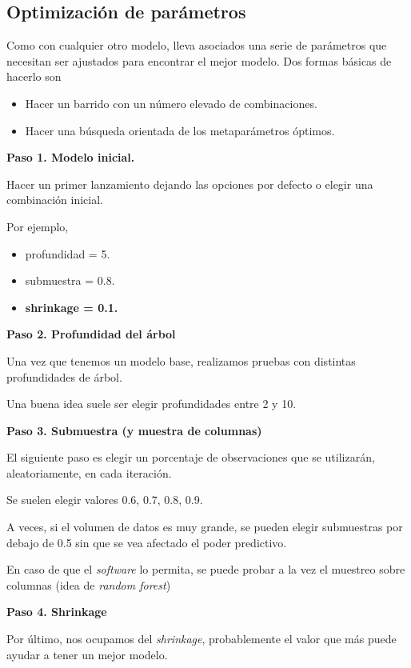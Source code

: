\documentclass[]{book}
\providecommand{\tightlist}{%
  \setlength{\itemsep}{0pt}\setlength{\parskip}{0pt}}
\begin{document}
\hypertarget{optimizacion-de-parametros}{%
\subsection{Optimización de parámetros}\label{optimizacion-de-parametros}}

Como con cualquier otro modelo, lleva asociados una serie de parámetros que necesitan ser ajustados para encontrar el mejor modelo. Dos formas básicas de hacerlo son

\begin{itemize}
\tightlist
\item
  Hacer un barrido con un número elevado de combinaciones.
\item
  Hacer una búsqueda orientada de los metaparámetros óptimos.
\end{itemize}

\textbf{Paso 1. Modelo inicial.}

Hacer un primer lanzamiento dejando las opciones por defecto o elegir una combinación inicial.

Por ejemplo,

\begin{itemize}
\tightlist
\item
  profundidad = 5.
\item
  submuestra = 0.8.
\item
  \textbf{shrinkage = 0.1.}
\end{itemize}

\textbf{Paso 2. Profundidad del árbol}

Una vez que tenemos un modelo base, realizamos pruebas con distintas profundidades de árbol.

Una buena idea suele ser elegir profundidades entre 2 y 10.

\textbf{Paso 3. Submuestra (y muestra de columnas)}

El siguiente paso es elegir un porcentaje de observaciones que se utilizarán, aleatoriamente, en cada iteración.

Se suelen elegir valores 0.6, 0.7, 0.8, 0.9.

A veces, si el volumen de datos es muy grande, se pueden elegir submuestras por debajo de 0.5 sin que se vea afectado el poder predictivo.

En caso de que el \emph{software} lo permita, se puede probar a la vez el muestreo sobre columnas (idea de \emph{random forest})

\textbf{Paso 4. Shrinkage}

Por último, nos ocupamos del \emph{shrinkage}, probablemente el valor que más puede ayudar a tener un mejor modelo.
\end{document}
